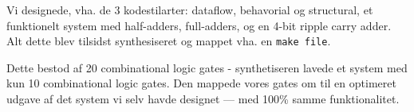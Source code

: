 Vi designede, vha. de 3 kodestilarter: dataflow, behavorial og structural, et funktionelt system med half-adders, full-adders, og en 4-bit ripple carry adder. Alt dette blev tilsidst synthesiseret og mappet vha. en \texttt{make file}.

Dette bestod af 20 combinational logic gates - synthetiseren lavede et system med kun 10 combinational logic gates. Den mappede vores gates om til en optimeret udgave af det system vi selv havde designet --- med 100\% samme funktionalitet.
